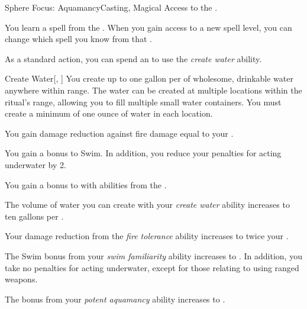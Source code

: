     \begin{feat}{Sphere Focus: Aquamancy}{Casting, Magical}
        \featpre Access to the  .

         You learn a spell from the  .
        When you gain access to a new spell level, you can change which spell you know from that .

         As a standard action, you can spend an  to use the \textit{create water} ability.

        \begin{ability}{Create Water}[, ]
            You create up to one gallon per  of wholesome, drinkable water anywhere within \rngclose range.
            The water can be created at multiple locations within the ritual's range, allowing you to fill multiple small water containers.
            You must create a minimum of one ounce of water in each location.
        \end{ability}

         You gain damage reduction against fire damage equal to your .

         You gain a  bonus to Swim.
        In addition, you reduce your penalties for acting underwater by 2.

         You gain a  bonus to  with abilities from the  . 

         The volume of water you can create with your \textit{create water} ability increases to ten gallons per .

         Your damage reduction from the \textit{fire tolerance} ability increases to twice your .

         The Swim bonus from your \textit{swim familiarity} ability increases to .
        In addition, you take no penalties for acting underwater, except for those relating to using ranged weapons.

         The bonus from your \textit{potent aquamancy} ability increases to .
    \end{feat}

